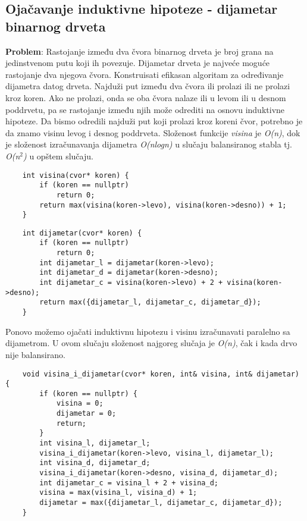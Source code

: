 \documentclass{article}
\begin{document}
\subsection{Ojačavanje induktivne hipoteze - dijametar binarnog drveta}
\textbf{Problem}: Rastojanje između dva čvora binarnog drveta je broj grana na jedinstvenom putu koji ih povezuje. Dijametar drveta je najveće moguće rastojanje dva njegova čvora. Konstruisati efikasan algoritam za određivanje dijametra datog drveta.
\newline Najduži put između dva čvora ili prolazi ili ne prolazi kroz koren. Ako ne prolazi,
onda se oba čvora nalaze ili u levom ili u desnom poddrvetu, pa se rastojanje između njih može odrediti na osnovu induktivne hipoteze. Da bismo odredili najduži put koji prolazi kroz koreni čvor, potrebno je da znamo visinu
levog i desnog poddrveta. Složenost funkcije \textit{visina} je \textit{O(n)}, dok je
složenost izračunavanja dijametra \textit{O(nlogn)} u slučaju balansiranog stabla tj. \textit{O(n$^2$)} u opštem slučaju.
\begin{lstlisting}
    int visina(cvor* koren) {
        if (koren == nullptr)
            return 0;
        return max(visina(koren->levo), visina(koren->desno)) + 1;
    }
\end{lstlisting}
\begin{lstlisting}
    int dijametar(cvor* koren) {
        if (koren == nullptr)
            return 0;
        int dijametar_l = dijametar(koren->levo);
        int dijametar_d = dijametar(koren->desno);
        int dijametar_c = visina(koren->levo) + 2 + visina(koren->desno);
        return max({dijametar_l, dijametar_c, dijametar_d});
    }
\end{lstlisting}
Ponovo možemo ojačati induktivnu hipotezu i visinu izračunavati paralelno sa dijametrom. U ovom slučaju složenost najgoreg slučaja je \textit{O(n)}, čak i kada drvo nije balansirano.
\begin{lstlisting}
    void visina_i_dijametar(cvor* koren, int& visina, int& dijametar) {
        if (koren == nullptr) {
            visina = 0;
            dijametar = 0;
            return;
        }
        int visina_l, dijametar_l;
        visina_i_dijametar(koren->levo, visina_l, dijametar_l);
        int visina_d, dijametar_d;
        visina_i_dijametar(koren->desno, visina_d, dijametar_d);
        int dijametar_c = visina_l + 2 + visina_d;
        visina = max(visina_l, visina_d) + 1;
        dijametar = max({dijametar_l, dijametar_c, dijametar_d});
    }
\end{lstlisting}
\end{document}

